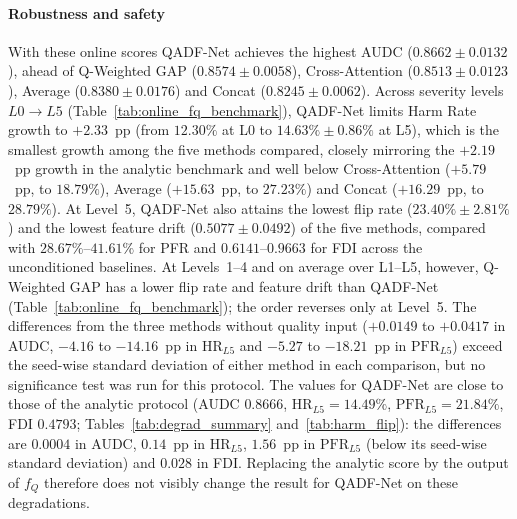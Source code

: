 \documentclass[final,5p,times,twocolumn,authoryear]{elsarticle}
\newcommand{\qadfnet}{QADF-Net}
\theoremstyle{plain}
\theoremstyle{remark}
\begin{document}
\paragraph{Robustness and safety} With these online scores \qadfnet{} achieves the highest AUDC ($0.8662 \pm 0.0132$), ahead of Q-Weighted GAP ($0.8574 \pm 0.0058$), Cross-Attention ($0.8513 \pm 0.0123$), Average ($0.8380 \pm 0.0176$) and Concat ($0.8245 \pm 0.0062$). Across severity levels $L0\to L5$ (Table~\ref{tab:online_fq_benchmark}), \qadfnet{} limits Harm Rate growth to $+2.33$~pp (from $12.30\%$ at L0 to $14.63\% \pm 0.86\%$ at L5), which is the smallest growth among the five methods compared, closely mirroring the $+2.19$~pp growth in the analytic benchmark and well below Cross-Attention ($+5.79$~pp, to $18.79\%$), Average ($+15.63$~pp, to $27.23\%$) and Concat ($+16.29$~pp, to $28.79\%$). At Level~5, \qadfnet{} also attains the lowest flip rate ($23.40\% \pm 2.81\%$) and the lowest feature drift ($0.5077 \pm 0.0492$) of the five methods, compared with $28.67\%$--$41.61\%$ for PFR and $0.6141$--$0.9663$ for FDI across the unconditioned baselines. At Levels~1--4 and on average over L1--L5, however, Q-Weighted GAP has a lower flip rate and feature drift than \qadfnet{} (Table~\ref{tab:online_fq_benchmark}); the order reverses only at Level~5. The differences from the three methods without quality input ($+0.0149$ to $+0.0417$ in AUDC, $-4.16$ to $-14.16$~pp in $\text{HR}_{L5}$ and $-5.27$ to $-18.21$~pp in $\text{PFR}_{L5}$) exceed the seed-wise standard deviation of either method in each comparison, but no significance test was run for this protocol. The values for \qadfnet{} are close to those of the analytic protocol (AUDC $0.8666$, $\text{HR}_{L5}=14.49\%$, $\text{PFR}_{L5}=21.84\%$, FDI $0.4793$; Tables~\ref{tab:degrad_summary} and~\ref{tab:harm_flip}): the differences are $0.0004$ in AUDC, $0.14$~pp in $\text{HR}_{L5}$, $1.56$~pp in $\text{PFR}_{L5}$ (below its seed-wise standard deviation) and $0.028$ in FDI. Replacing the analytic score by the output of $f_Q$ therefore does not visibly change the result for \qadfnet{} on these degradations.
\end{document}
